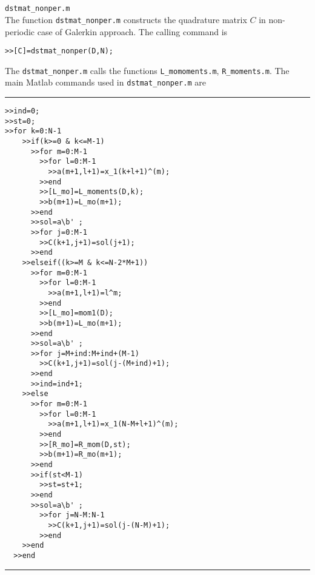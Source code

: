 \documentclass[acmtoms]{acmtrans2m}
\begin{document}
\section{} \verb#dstmat_nonper.m# \\
The function \verb#dstmat_nonper.m# constructs the quadrature matrix $C$ in non-periodic case of Galerkin approach. The calling command is
\begin{verbatim}
>>[C]=dstmat_nonper(D,N);
\end{verbatim}
The \verb#dstmat_nonper.m# calls the functions \verb#L_momoments.m#, \verb#R_moments.m#. The main Matlab commands used in \verb#dstmat_nonper.m# are
\hrule
\begin{verbatim}
>>ind=0;
>>st=0;
>>for k=0:N-1
    >>if(k>=0 & k<=M-1)
      >>for m=0:M-1
        >>for l=0:M-1
          >>a(m+1,l+1)=x_1(k+l+1)^(m);
        >>end
        >>[L_mo]=L_moments(D,k);
        >>b(m+1)=L_mo(m+1);
      >>end
      >>sol=a\b' ;
      >>for j=0:M-1
        >>C(k+1,j+1)=sol(j+1);
      >>end
    >>elseif((k>=M & k<=N-2*M+1))
      >>for m=0:M-1
        >>for l=0:M-1
          >>a(m+1,l+1)=l^m;
        >>end
        >>[L_mo]=mom1(D);
        >>b(m+1)=L_mo(m+1);
      >>end
      >>sol=a\b' ;
      >>for j=M+ind:M+ind+(M-1)
        >>C(k+1,j+1)=sol(j-(M+ind)+1);
      >>end
      >>ind=ind+1;
    >>else
      >>for m=0:M-1
        >>for l=0:M-1
          >>a(m+1,l+1)=x_1(N-M+l+1)^(m);
        >>end
        >>[R_mo]=R_mom(D,st);
        >>b(m+1)=R_mo(m+1);
      >>end
      >>if(st<M-1)
        >>st=st+1;
      >>end
      >>sol=a\b' ;
        >>for j=N-M:N-1
          >>C(k+1,j+1)=sol(j-(N-M)+1);
        >>end
    >>end
  >>end
\end{verbatim}
\hrule
\vspace{.5cm}
\end{document}
